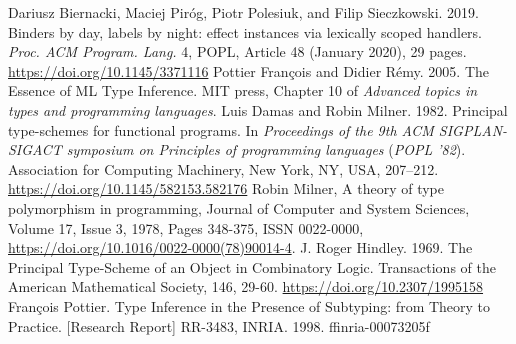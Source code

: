 \documentclass[declaration,shortabstract]{iithesis}
\theoremstyle{definition} \newtheorem{definition}{Definition}[section]
\begin{document}
\begin{thebibliography}{1}
    Dariusz Biernacki, Maciej Piróg, Piotr Polesiuk, and Filip Sieczkowski. 2019. Binders by day, labels by night: effect instances via lexically scoped handlers. \textit{Proc. ACM Program. Lang.} 4, POPL, Article 48 (January 2020), 29 pages. \url{https://doi.org/10.1145/3371116}
    Pottier François and Didier Rémy. 2005.
    The Essence of ML Type Inference.
    MIT press, Chapter 10 of \textit{Advanced topics in types and programming languages}.
    Luis Damas and Robin Milner. 1982. Principal type-schemes for functional programs. In \textit{Proceedings of the 9th ACM SIGPLAN-SIGACT symposium on Principles of programming languages} (\textit{POPL '82}). Association for Computing Machinery, New York, NY, USA, 207–212. \url{https://doi.org/10.1145/582153.582176}
    Robin Milner,
    A theory of type polymorphism in programming,
    Journal of Computer and System Sciences,
    Volume 17, Issue 3,
    1978,
    Pages 348-375,
    ISSN 0022-0000,
     \url{https://doi.org/10.1016/0022-0000(78)90014-4}.
    J. Roger Hindley. 1969. The Principal Type-Scheme of an Object in Combinatory Logic. Transactions of the American Mathematical Society, 146, 29-60. \url{https://doi.org/10.2307/1995158}
    François Pottier. Type Inference in the Presence of Subtyping: from Theory to Practice. [Research
    Report] RR-3483, INRIA. 1998. ffinria-00073205f
\end{thebibliography}
\end{document}

